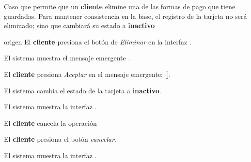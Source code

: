 %
%

{
  Caso que permite que un \textbf{cliente} elimine una de las formas de pago
  que tiene guardadas. Para mantener consistencia en la base, el registro de
  la tarjeta no será eliminado; sino que cambiará su estado a \textbf{inactivo}

  \begin{trayectoriaPrincipal}

    \item[origen] El \textbf{cliente} presiona el botón de \textit{Eliminar}
      en la interfaz .

    \item El sistema muestra el mensaje emergente
      .

    \item El \textbf{cliente} presiona \textit{Aceptar} en el mensaje
      emergente; [].

    \item El sistema cambia el estado de la tarjeta a \textbf{inactivo}.

    \item El sistema muestra la interfaz
      .

  \end{trayectoriaPrincipal}


  \begin{trayectoriaAlternativa}
    {El \textbf{cliente} cancela la operación}

    \item El \textbf{cliente} presiona el botón \textit{cancelar}.

    \item El sistema muestra la interfaz
      .

  \end{trayectoriaAlternativa}
}
